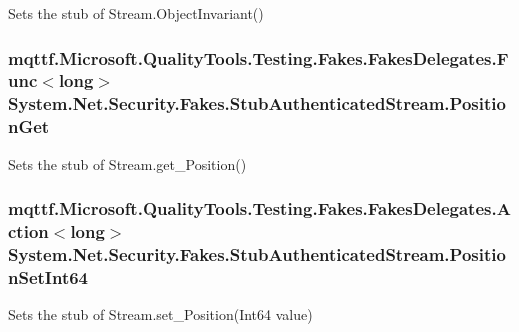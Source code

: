 Sets the stub of Stream.\-Object\-Invariant()

\hypertarget{class_system_1_1_net_1_1_security_1_1_fakes_1_1_stub_authenticated_stream_a7a4fb3b68f1b7c1691d5a77c86862e32}{
\subsubsection[{Position\-Get}]{\setlength{\rightskip}{0pt plus 5cm}mqttf.\-Microsoft.\-Quality\-Tools.\-Testing.\-Fakes.\-Fakes\-Delegates.\-Func$<$long$>$ System.\-Net.\-Security.\-Fakes.\-Stub\-Authenticated\-Stream.\-Position\-Get}}\label{class_system_1_1_net_1_1_security_1_1_fakes_1_1_stub_authenticated_stream_a7a4fb3b68f1b7c1691d5a77c86862e32}


Sets the stub of Stream.\-get\-\_\-\-Position()

\hypertarget{class_system_1_1_net_1_1_security_1_1_fakes_1_1_stub_authenticated_stream_a021571125146855b5d9dfe1de12a4dde}{
\subsubsection[{Position\-Set\-Int64}]{\setlength{\rightskip}{0pt plus 5cm}mqttf.\-Microsoft.\-Quality\-Tools.\-Testing.\-Fakes.\-Fakes\-Delegates.\-Action$<$long$>$ System.\-Net.\-Security.\-Fakes.\-Stub\-Authenticated\-Stream.\-Position\-Set\-Int64}}\label{class_system_1_1_net_1_1_security_1_1_fakes_1_1_stub_authenticated_stream_a021571125146855b5d9dfe1de12a4dde}


Sets the stub of Stream.\-set\-\_\-\-Position(\-Int64 value)

